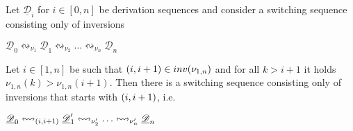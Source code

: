 \documentclass[a4paper,UKenglish,cleveref,pdftex,thm-restate,numberwithinsect]{lipics-v2021}
\newcommand{\interval}[2][1]{\ensuremath{[{#1},{#2}]}}
\newcommand{\dder}[1]{\mathscr{#1}}
\newcommand{\der}[1]{\underline{\dder{#1}}}
\newcommand{\inv}[1]{\mathsf{inv}({#1})}
\newcommand{\shift}[1]{\ensuremath{\mathrel{{\leftrightsquigarrow}_{#1}}}}
\begin{document}
\begin{lemma}
  \label{le:switchA}
  Let $\der{D}_i$ for $i \in \interval[0]{n}$ be derivation sequences
  and consider a switching sequence consisting only of inversions
  \begin{center}
    $\der{D}_0 \shift{\nu_1} \der{D}_1 \shift{\nu_2} \ldots
    \shift{\nu_n} \der{D}_n$
  \end{center}
  Let $i \in \interval{n}$ be such that
  $\transp{i} \in \inv{\nu_{1,n}}$ and for all $k > i+1$ it holds
  $\nu_{1,n}(k) > \nu_{1,n}(i+1)$.  Then there is a switching sequence
  consisting only of inversions that starts with $\transp{i}$, i.e.
  \begin{center}
    $\der{D}_0 \shift{\transp{i}} \der{D}_1' \shift{\nu_2'} \ldots
    \shift{\nu_n'} \der{D}_n$
  \end{center}
\end{lemma}
\end{document}
